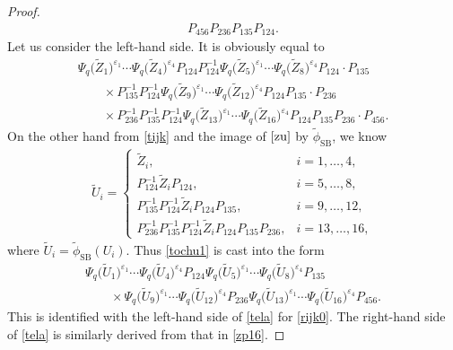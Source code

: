 \documentclass[11pt]{article}
\numberwithin{equation}{section}
\numberwithin{equation}{section}
\begin{document}
\begin{proof}
\begin{gather}
P_{456}P_{236}P_{135}P_{124}.\label{zp16}
\end{gather}
Let us consider the left-hand side.
It is obviously equal to
\begin{gather}
\Psi_q\bigl(\tilde{Z}_1\bigr)^{\varepsilon_1}\dotsm \Psi_q\bigl({\tilde Z}_{4}\bigr)^{\varepsilon_4}
P_{124}
P^{-1}_{124}
\Psi_q\bigl(\tilde{Z}_5\bigr)^{\varepsilon_1}\dotsm \Psi_q\bigl({\tilde Z}_{8}\bigr)^{\varepsilon_4}
P_{124} \cdot P_{135}\nonumber
\\
\qquad \times
P^{-1}_{135} P^{-1}_{124}
\Psi_q\bigl(\tilde{Z}_9\bigr)^{\varepsilon_1}\dotsm \Psi_q\bigl({\tilde Z}_{12}\bigr)^{\varepsilon_4}
P_{124} P_{135} \cdot P_{236}\nonumber
\\
\qquad \times
P^{-1}_{236} P^{-1}_{135} P^{-1}_{124}
\Psi_q\bigl(\tilde{Z}_{13}\bigr)^{\varepsilon_1}\dotsm \Psi_q\bigl({\tilde Z}_{16}\bigr)^{\varepsilon_4}
P_{124} P_{135} P_{236} \cdot P_{456}.\label{tochu1}
\end{gather}
On the other hand from \eqref{tijk} and the image of $\eqref{zu}$ by $\tilde{\phi}_\mathrm{SB}$, we know
\begin{align*}
{\tilde U}_i = \begin{cases}
\tilde{Z}_i, & i=1,\dotsc, 4,
\\
P_{124}^{-1} \tilde{Z}_i P_{124}, & i=5,\dotsc, 8,
\\
P_{135}^{-1}P_{124}^{-1} \tilde{Z}_i P_{124}P_{135}, & i=9,\dotsc, 12,
\\
P_{236}^{-1}P_{135}^{-1}P_{124}^{-1} \tilde{Z}_i
P_{124}P_{135} P_{236}, & i=13,\dotsc, 16,
\end{cases}
\end{align*}
where $\tilde{U}_i = \tilde{\phi}_\mathrm{SB}(U_i)$.
Thus \eqref{tochu1} is cast into the form
\begin{gather*}
\Psi_q\bigl(\tilde{U}_1\bigr)^{\varepsilon_1}\cdots \Psi_q\bigl({\tilde U}_{4}\bigr)^{\varepsilon_4}
P_{124}
\Psi_q\bigl(\tilde{U}_5\bigr)^{\varepsilon_1}\cdots \Psi_q\bigl({\tilde U}_{8}\bigr)^{\varepsilon_4}
P_{135}
\\
\qquad\times
\Psi_q\bigl(\tilde{U}_9\bigr)^{\varepsilon_1}\cdots \Psi_q\bigl({\tilde U}_{12}\bigr)^{\varepsilon_4}
P_{236}
\Psi_q\bigl(\tilde{U}_{13}\bigr)^{\varepsilon_1}\cdots \Psi_q\bigl({\tilde U}_{16}\bigr)^{\varepsilon_4}
P_{456}.
\end{gather*}
This is identified with the left-hand side of \eqref{tela} for \eqref{rijk0}.
The right-hand side of \eqref{tela} is similarly derived from that in \eqref{zp16}.
\end{proof}
\end{document}
